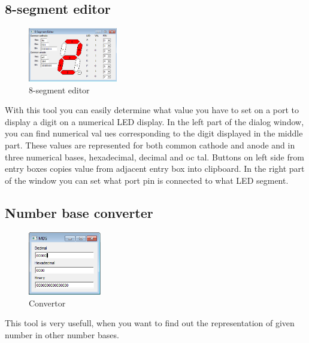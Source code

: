 \subsection{8-segment editor}
    \begin{figure}
        \centering{}
        \includegraphics[width=110pt]{img/8segment.png}
        \caption{8-segment editor}
    \end{figure}
    With this tool you can easily determine what value you have to set on a port to display a digit on a numerical LED display. In the left part of the dialog window, you can find numerical val ues corresponding to the digit displayed in the middle part. These values are represented for both common cathode and anode and in three numerical bases, hexadecimal, decimal and oc tal. Buttons on left side from entry boxes copies value from adjacent entry box into clipboard. In the right part of the window you can set what port pin is connected to what LED segment.

\subsection{Number base converter}
    \begin{figure}
            \centering
            \includegraphics[width=90pt]{img/convertor.png}
            \caption{Convertor}
    \end{figure}
    This tool is very usefull, when you want to find out the representation of given number in other number bases.
